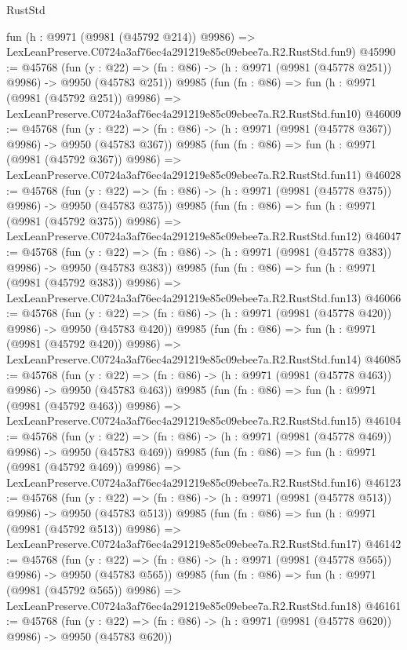\begin{lexlean}{RustStd}
\begin{coremodule}
    fun (h : @9971 (@9981 (@45792 @214)) @9986) =>
    LexLeanPreserve.C0724a3af76ec4a291219e85c09ebee7a.R2.RustStd.fun9)
@45990 := @45768
    (fun (y : @22) => (fn : @86) -> (h : @9971 (@9981 (@45778 @251)) @9986) -> @9950 (@45783 @251))
    @9985
    (fun (fn : @86) =>
    fun (h : @9971 (@9981 (@45792 @251)) @9986) =>
    LexLeanPreserve.C0724a3af76ec4a291219e85c09ebee7a.R2.RustStd.fun10)
@46009 := @45768
    (fun (y : @22) => (fn : @86) -> (h : @9971 (@9981 (@45778 @367)) @9986) -> @9950 (@45783 @367))
    @9985
    (fun (fn : @86) =>
    fun (h : @9971 (@9981 (@45792 @367)) @9986) =>
    LexLeanPreserve.C0724a3af76ec4a291219e85c09ebee7a.R2.RustStd.fun11)
@46028 := @45768
    (fun (y : @22) => (fn : @86) -> (h : @9971 (@9981 (@45778 @375)) @9986) -> @9950 (@45783 @375))
    @9985
    (fun (fn : @86) =>
    fun (h : @9971 (@9981 (@45792 @375)) @9986) =>
    LexLeanPreserve.C0724a3af76ec4a291219e85c09ebee7a.R2.RustStd.fun12)
@46047 := @45768
    (fun (y : @22) => (fn : @86) -> (h : @9971 (@9981 (@45778 @383)) @9986) -> @9950 (@45783 @383))
    @9985
    (fun (fn : @86) =>
    fun (h : @9971 (@9981 (@45792 @383)) @9986) =>
    LexLeanPreserve.C0724a3af76ec4a291219e85c09ebee7a.R2.RustStd.fun13)
@46066 := @45768
    (fun (y : @22) => (fn : @86) -> (h : @9971 (@9981 (@45778 @420)) @9986) -> @9950 (@45783 @420))
    @9985
    (fun (fn : @86) =>
    fun (h : @9971 (@9981 (@45792 @420)) @9986) =>
    LexLeanPreserve.C0724a3af76ec4a291219e85c09ebee7a.R2.RustStd.fun14)
@46085 := @45768
    (fun (y : @22) => (fn : @86) -> (h : @9971 (@9981 (@45778 @463)) @9986) -> @9950 (@45783 @463))
    @9985
    (fun (fn : @86) =>
    fun (h : @9971 (@9981 (@45792 @463)) @9986) =>
    LexLeanPreserve.C0724a3af76ec4a291219e85c09ebee7a.R2.RustStd.fun15)
@46104 := @45768
    (fun (y : @22) => (fn : @86) -> (h : @9971 (@9981 (@45778 @469)) @9986) -> @9950 (@45783 @469))
    @9985
    (fun (fn : @86) =>
    fun (h : @9971 (@9981 (@45792 @469)) @9986) =>
    LexLeanPreserve.C0724a3af76ec4a291219e85c09ebee7a.R2.RustStd.fun16)
@46123 := @45768
    (fun (y : @22) => (fn : @86) -> (h : @9971 (@9981 (@45778 @513)) @9986) -> @9950 (@45783 @513))
    @9985
    (fun (fn : @86) =>
    fun (h : @9971 (@9981 (@45792 @513)) @9986) =>
    LexLeanPreserve.C0724a3af76ec4a291219e85c09ebee7a.R2.RustStd.fun17)
@46142 := @45768
    (fun (y : @22) => (fn : @86) -> (h : @9971 (@9981 (@45778 @565)) @9986) -> @9950 (@45783 @565))
    @9985
    (fun (fn : @86) =>
    fun (h : @9971 (@9981 (@45792 @565)) @9986) =>
    LexLeanPreserve.C0724a3af76ec4a291219e85c09ebee7a.R2.RustStd.fun18)
@46161 := @45768
    (fun (y : @22) => (fn : @86) -> (h : @9971 (@9981 (@45778 @620)) @9986) -> @9950 (@45783 @620))

\end{coremodule}
\end{lexlean}
